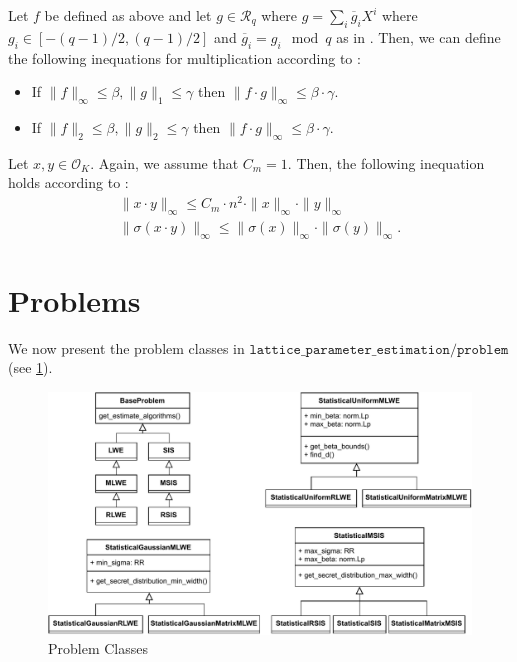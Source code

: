 Let $f$ be defined as above and let $g \in \mathcal{R}_q$ where $g = \sum_i \overline{g}_i X^i$ where $g_i \in \left[-(q-1)/2, (q-1)/2\right]$ and $\overline{g}_i = g_i \mod q$ as in \cite{BDLOP18}. Then, we can define the following inequations for multiplication according to \cite{BDLOP18}:

\begin{itemize}
    \item If $\|f\|_\infty \leq \beta, \|g\|_1 \leq \gamma$ then $\|f \cdot g\|_\infty \leq \beta \cdot \gamma$.
    \item If $\|f\|_2 \leq \beta, \|g\|_2 \leq \gamma$ then $\|f \cdot g\|_\infty \leq \beta \cdot \gamma$.
\end{itemize}

Let $x, y \in \mathcal{O}_K$. Again, we assume that $C_m = 1$. Then, the following inequation holds according to \cite{DPSZ12}:
\begin{align}
    \| x \cdot y \|_\infty \leq C_m \cdot n^2 \cdot \| x \|_\infty \cdot \| y \|_\infty \\
    \| \sigma(x \cdot y) \|_\infty \leq  \| \sigma(x) \|_\infty \cdot \| \sigma(y) \|_\infty.
\end{align}




\section{Problems}
We now present the problem classes in $\texttt{lattice\_parameter\_estimation/problem}$ (see \cref{fig:problem-classes}).

\begin{figure}[h]
    \centering
    \includegraphics[width=1\textwidth]{graphics/problem_classes.pdf}
    \caption{Problem Classes}\label{fig:problem-classes}
\end{figure}

